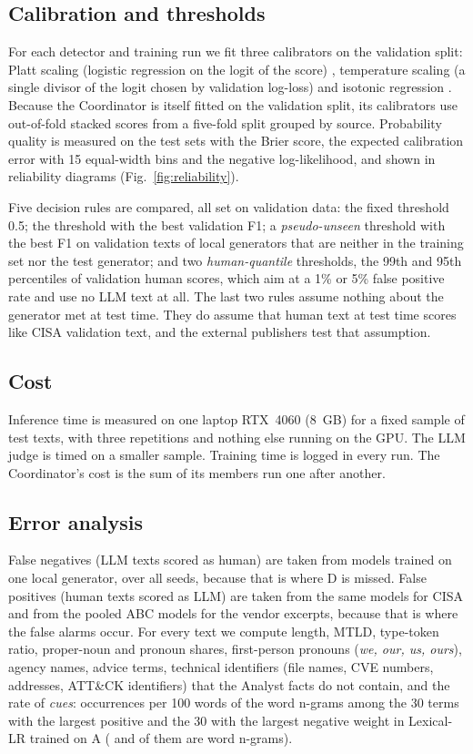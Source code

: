 \documentclass[journal]{IEEEtran}
\begin{document}
\subsection{Calibration and thresholds}
For each detector and training run we fit three calibrators on the validation split: Platt scaling (logistic
regression on the logit of the score) \cite{Platt_1999}, temperature scaling (a single divisor of the logit chosen by
validation log-loss) \cite{Guo_2017} and isotonic regression \cite{Zadrozny_2002}. Because the Coordinator is itself
fitted on the validation split, its calibrators use out-of-fold stacked scores from a five-fold split grouped by
source. Probability quality is measured on the test sets with the Brier score, the expected calibration error with
15 equal-width bins \cite{Naeini_2015} and the negative log-likelihood, and shown in reliability diagrams
(Fig.~\ref{fig:reliability}).

Five decision rules are compared, all set on validation data: the fixed threshold 0.5; the threshold with the best
validation F1; a \emph{pseudo-unseen} threshold with the best F1 on validation texts of local generators that are
neither in the training set nor the test generator; and two \emph{human-quantile} thresholds, the 99th and 95th
percentiles of validation human scores, which aim at a 1\% or 5\% false positive rate and use no LLM text at all.
The last two rules assume nothing about the generator met at test time. They do assume that human text at test
time scores like CISA validation text, and the external publishers test that assumption.

\subsection{Cost}
Inference time is measured on one laptop RTX~4060 (8~GB) for a fixed sample of test texts, with three repetitions
and nothing else running on the GPU. The LLM judge is timed on a smaller sample. Training time is logged in every
run. The Coordinator's cost is the sum of its members run one after another.

\subsection{Error analysis}\label{sec:errors}
False negatives (LLM texts scored as human) are taken from models trained on one local generator, over all seeds,
because that is where D is missed. False positives (human texts scored as LLM) are taken from the same models for
CISA and from the pooled ABC models for the vendor excerpts, because that is where the false alarms occur. For
every text we compute length, MTLD, type-token ratio, proper-noun and pronoun shares, first-person pronouns
(\emph{we, our, us, ours}), agency names, advice terms, technical identifiers (file names, CVE numbers, addresses,
ATT\&CK identifiers) that the Analyst facts do not contain, and the rate of \emph{cues}: occurrences per 100 words
of the word n-grams among the 30 terms with the largest positive and the 30 with the largest negative weight in
Lexical-LR trained on A (\NCueLlm{} and \NCueHuman{} of them are word n-grams).
\end{document}
